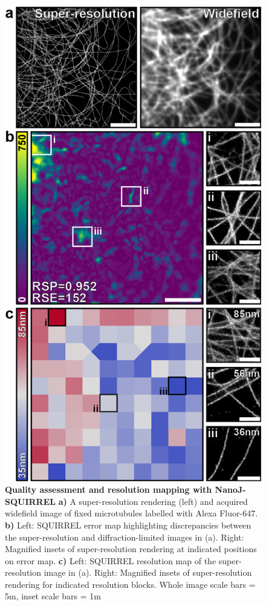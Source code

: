\begin{figure}[!t]
    \centering
    \includegraphics[width=\linewidth]{Figures/SQUIRREL_draft_column_format.png}
    \caption{\textbf{Quality assessment and resolution mapping with NanoJ-SQUIRREL} \textbf{a)} A super-resolution rendering (left) and acquired widefield image of fixed microtubules labelled with Alexa Fluor-647. \textbf{b)} Left: SQUIRREL error map highlighting discrepancies between the super-resolution and diffraction-limited images in (a). Right: Magnified insets of super-resolution rendering at indicated positions on error map. \textbf{c)} Left: SQUIRREL resolution map of the super-resolution image in (a). Right: Magnified insets of super-resolution rendering for indicated resolution blocks. Whole image scale bars = 5\micro m, inset scale bars = 1\micro m}
    \label{fig:SQUIRREL}
\end{figure}

